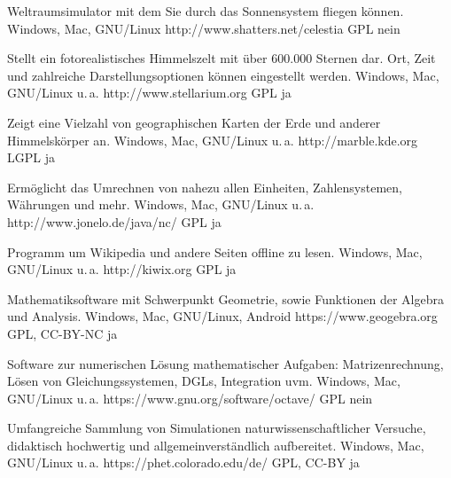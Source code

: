 




{Weltraumsimulator mit dem Sie durch das Sonnensystem fliegen können.}
{Windows, Mac, GNU/Linux}
{http://www.shatters.net/celestia}
{GPL}
{nein}

{Stellt ein fotorealistisches Himmelszelt mit über 600.000 Sternen dar. Ort, Zeit und zahlreiche Darstellungsoptionen können eingestellt werden.}
{Windows, Mac, GNU/Linux u.\,a.}
{http://www.stellarium.org}
{GPL}
{ja}

{Zeigt eine Vielzahl von geographischen Karten der Erde und anderer Himmelskörper an.}
{Windows, Mac, GNU/Linux u.\,a.}
{http://marble.kde.org}
{LGPL}
{ja}

{Ermöglicht das Umrechnen von nahezu allen Einheiten, Zahlensystemen, Währungen und mehr.}
{Windows, Mac, GNU/Linux u.\,a.}
{http://www.jonelo.de/java/nc/}
{GPL}
{ja}

{Programm um Wikipedia und andere Seiten offline zu lesen.}
{Windows, Mac, GNU/Linux u.\,a.}
{http://kiwix.org}
{GPL}
{ja}

{Mathematiksoftware mit Schwerpunkt Geometrie, sowie Funktionen der Algebra und Analysis.}
{Windows, Mac, GNU/Linux, Android}
{https://www.geogebra.org}
{GPL, CC-BY-NC}
{ja}

{Software zur numerischen Lösung mathematischer Aufgaben: Matrizenrechnung, Lösen von Gleichungssystemen, DGLs, Integration uvm.}
{Windows, Mac, GNU/Linux u.\,a.}
{https://www.gnu.org/software/octave/}
{GPL}
{nein}

{Umfangreiche Sammlung von Simulationen naturwissenschaftlicher Versuche, didaktisch hochwertig und allgemeinverständlich aufbereitet.}
{Windows, Mac, GNU/Linux u.\,a.}
{https://phet.colorado.edu/de/}
{GPL, CC-BY}
{ja}

\backpage


